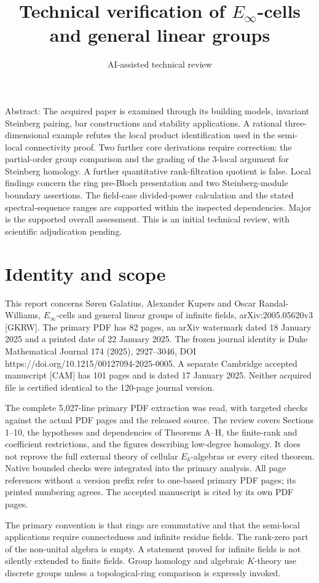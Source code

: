\documentclass[10pt]{article}
\title{Technical verification of
\(E_\infty\)-cells and general linear groups}
\author{AI-assisted technical review}
\date{}
\begin{document}
\maketitle
Abstract: The acquired paper is examined through its building models, invariant Steinberg pairing, bar constructions and stability applications. A rational three-dimensional example refutes the local product identification used in the semi-local connectivity proof. Two further core derivations require correction: the partial-order group comparison and the grading of the \(3\)-local argument for Steinberg homology. A further quantitative rank-filtration quotient is false. Local findings concern the ring pre-Bloch presentation and two Steinberg-module boundary assertions. The field-case divided-power calculation and the stated spectral-sequence ranges are supported within the inspected dependencies. Major is the supported overall assessment. This is an initial technical review, with scientific adjudication pending.\par
\section*{Identity and scope}
This report concerns Søren Galatius, Alexander Kupers and Oscar Randal-Williams, \(E_\infty\)-cells and general linear groups of infinite fields, arXiv:2005.05620v3 [GKRW]. The primary PDF has 82 pages, an arXiv watermark dated 18 January 2025 and a printed date of 22 January 2025. The frozen journal identity is Duke Mathematical Journal 174 (2025), 2927–3046, DOI https://doi.org/10.1215/00127094-2025-0005. A separate Cambridge accepted manuscript [CAM] has 101 pages and is dated 17 January 2025. Neither acquired file is certified identical to the 120-page journal version.\par
The complete 5,027-line primary PDF extraction was read, with targeted checks against the actual PDF pages and the released source. The review covers Sections 1–10, the hypotheses and dependencies of Theorems A–H, the finite-rank and coefficient restrictions, and the figures describing low-degree homology. It does not reprove the full external theory of cellular \(E_k\)-algebras or every cited theorem. Native bounded checks were integrated into the primary analysis. All page references without a version prefix refer to one-based primary PDF pages; its printed numbering agrees. The accepted manuscript is cited by its own PDF pages.\par
The primary convention is that rings are commutative and that the semi-local applications require connectedness and infinite residue fields. The rank-zero part of the non-unital algebra is empty. A statement proved for infinite fields is not silently extended to finite fields. Group homology and algebraic \(K\)-theory use discrete groups unless a topological-ring comparison is expressly invoked.\par
\end{document}
